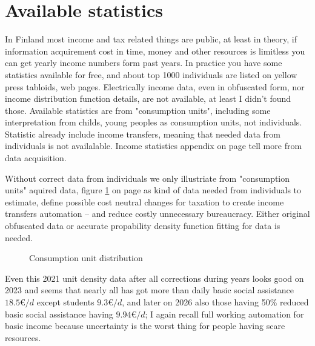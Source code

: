 \section{Available statistics}
\label{income tax statistics}
In Finland most income and tax related things are public, at least in theory,
if information acquirement cost in time, money and other resources is
limitless you can get yearly income numbers form past years. In practice you
have some statistics available for free, and about top 1000 individuals are
listed on yellow press tabloids, web pages\allowbreak\cite{
 IncomeTaxSmoothness}. Electrically income data, even in obfuscated form, nor
income distribution function details, are not available, at least I didn't
found those. Available statistics are from "consumption units", including some
interpretation from childs, young peoples as consumption units, not
individuals\allowbreak\cite{ConsumptionUnitD}. Statistic already include
income transfers, meaning that needed data from individuals is not
availalable. Income statistics appendix on page \pageref{statistics} tell more
from data acquisition.

Without correct data from individuals we only illustriate from "consumption
units" aquired data, figure \ref{fig:ConsumptionUnit} on page
\pageref{fig:ConsumptionUnit} as kind of data needed from individuals to
estimate, define possible cost neutral chan\-ges for taxation to create income
transfers automation -- and reduce costly unnecessary bureaucracy. Either
original obfuscated data or accurate propability density function fitting for
data is needed.

\begin{figure} %
 \begin{center}
  \caption{Consumption unit distribution}
  \label{fig:ConsumptionUnit} 
 \end{center}
\end{figure}

Even this 2021 unit density data after all corrections during years looks good
on 2023 and seems that nearly all has got more than daily basic social
assistance $18.5\euro/d$\allowbreak\cite{KELA_BASIC_ASSISTANCE} except
students $9.3\euro/d$\allowbreak\cite{KELA_StudyGrant}, and later on 2026 also
those having 50\% reduced basic social assistance having
$9.94\euro/d$\allowbreak\cite{KELA_50PROS_BASIC_ASSISTANCE}; I again recall
full working automation for basic income\allowbreak\cite{
BasicIncomeInit}\allowbreak\cite{A2PalkkaerotIlta} because uncertainty is the
worst thing for people having scare resources.


